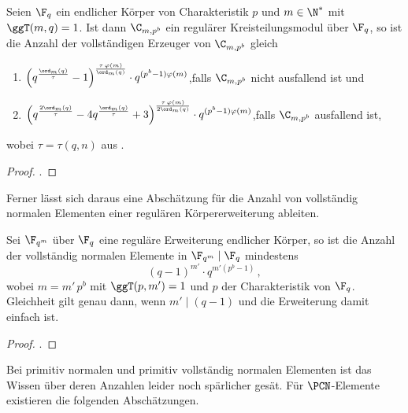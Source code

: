 \begin{satz}
  \label{satz:anzahl_vollst_erzeuger}
  Seien $\F_q$ ein endlicher Körper von Charakteristik $p$ und $m \in \N^\ast$
  mit $\ggT(m,q)=1$. Ist dann $\C_{m,p^b}$ ein regulärer Kreisteilungsmodul
  über $\F_q$, so ist die Anzahl der vollständigen Erzeuger von 
  $\C_{m,p^b}$ gleich
  \begin{enumerate}
    \item $\displaystyle \left( q^{\frac{\ord_m(q)}{\tau}}-1 \right)%
      ^{\frac{\tau\,\varphi(m)}{\ord_m(q)}} \cdot 
      q^{(p^b-1)\varphi(m)}$,\quad falls $\C_{m,p^b}$ nicht ausfallend ist und
    \item $\displaystyle \left( q^{\frac{2\ord_m(q)}{\tau}}
      -4q^{\frac{\ord_m(q)}{\tau}}+3\right)%
      ^{\frac{\tau\,\varphi(m)}{2\ord_m(q)}} \cdot 
      q^{(p^b-1)\varphi(m)}$,\quad falls $\C_{m,p^b}$ ausfallend ist,
  \end{enumerate}
  wobei $\tau = \tau(q,n)$ aus .
\end{satz}
\begin{proof}
  \autocite[Proposition 21.1, Proposition 21.2]{hachenberger1997finite}.
\end{proof}

Ferner lässt sich daraus eine Abschätzung für die Anzahl von vollständig
normalen Elementen einer regulären Körpererweiterung ableiten.

\begin{satz}
  Sei $\F_{q^m}$ über $\F_q$ eine reguläre Erweiterung endlicher Körper, so ist
  die Anzahl der vollständig normalen Elemente in $\F_{q^m}\mid \F_q$
  mindestens
  \[ (q-1)^{m'}\cdot q^{m'(p^b-1)} \,,\]
  wobei $m = m'\,p^b$ mit $\ggT(p,m')=1$ und $p$ der Charakteristik von $\F_q$.
  Gleichheit gilt genau dann, wenn $m' \mid (q-1)$ und die Erweiterung damit 
  einfach ist.
\end{satz}
\begin{proof}
  \autocite[Theorem 21.3, Theorem 6.1]{hachenberger1997finite}.
\end{proof}

Bei primitiv normalen und primitiv vollständig normalen Elementen
ist das Wissen über deren Anzahlen leider noch spärlicher gesät. 
Für $\PCN$-Elemente existieren die folgenden Abschätzungen.

